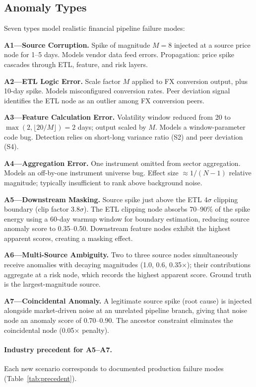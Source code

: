 \documentclass{article}
\begin{document}
\subsection{Anomaly Types}

Seven types model realistic financial pipeline failure modes:

\textbf{A1---Source Corruption.}
Spike of magnitude $M = 8$ injected at a source price node for 1--5 days.
Models vendor data feed errors.
Propagation: price spike cascades through ETL, feature, and risk layers.

\textbf{A2---ETL Logic Error.}
Scale factor $M$ applied to FX conversion output, plus 10-day spike.
Models misconfigured conversion rates.
Peer deviation signal identifies the ETL node as an outlier among
FX conversion peers.

\textbf{A3---Feature Calculation Error.}
Volatility window reduced from 20 to $\max(2, \lfloor 20/M \rfloor) = 2$
days; output scaled by $M$.
Models a window-parameter code bug.
Detection relies on short-long variance ratio (S2) and peer deviation (S4).

\textbf{A4---Aggregation Error.}
One instrument omitted from sector aggregation.
Models an off-by-one instrument universe bug.
Effect size $\approx 1/(N-1)$ relative magnitude; typically insufficient to
rank above background noise.

\textbf{A5---Downstream Masking.}
Source spike just above the ETL 4$\sigma$ clipping boundary (clip factor 3.8$\sigma$).
The ETL clipping node absorbs 70--90\% of the spike energy using a 60-day warmup window
for boundary estimation, reducing source anomaly score to 0.35--0.50.
Downstream feature nodes exhibit the highest apparent scores, creating a masking effect.

\textbf{A6---Multi-Source Ambiguity.}
Two to three source nodes simultaneously receive anomalies with decaying magnitudes
(1.0, 0.6, 0.35$\times$); their contributions aggregate at a risk node, which records
the highest apparent score. Ground truth is the largest-magnitude source.

\textbf{A7---Coincidental Anomaly.}
A legitimate source spike (root cause) is injected alongside market-driven noise
at an unrelated pipeline branch, giving that noise node an anomaly score of 0.70--0.90.
The ancestor constraint eliminates the coincidental node (0.05$\times$ penalty).

\paragraph{Industry precedent for A5--A7.}
Each new scenario corresponds to documented production failure modes
(Table~\ref{tab:precedent}).
\end{document}

